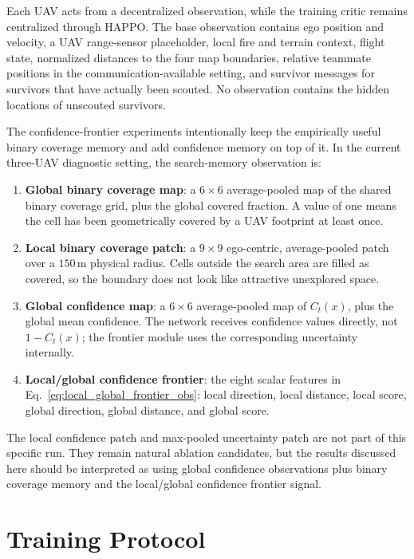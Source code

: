 \documentclass{article}
\newcommand{\conf}{C}
\begin{document}
Each UAV acts from a decentralized observation, while the training critic remains
centralized through HAPPO. The base observation contains ego position and
velocity, a UAV range-sensor placeholder, local fire and terrain context, flight
state, normalized distances to the four map boundaries, relative teammate
positions in the communication-available setting, and survivor messages for
survivors that have actually been scouted. No observation contains the hidden
locations of unscouted survivors.

The confidence-frontier experiments intentionally keep the empirically useful
binary coverage memory and add confidence memory on top of it. In the current
three-UAV diagnostic setting, the search-memory observation is:
\begin{enumerate}[leftmargin=1.5em]
    \item \textbf{Global binary coverage map}: a \(6 \times 6\) average-pooled map
    of the shared binary coverage grid, plus the global covered fraction. A value
    of one means the cell has been geometrically covered by a UAV footprint at
    least once.
    \item \textbf{Local binary coverage patch}: a \(9 \times 9\) ego-centric,
    average-pooled patch over a \(150\,\mathrm{m}\) physical radius. Cells outside
    the search area are filled as covered, so the boundary does not look like
    attractive unexplored space.
    \item \textbf{Global confidence map}: a \(6 \times 6\) average-pooled map of
    \(\conf_t(x)\), plus the global mean confidence. The network receives
    confidence values directly, not \(1-\conf_t(x)\); the frontier module uses
    the corresponding uncertainty internally.
    \item \textbf{Local/global confidence frontier}: the eight scalar features in
    Eq.~\ref{eq:local_global_frontier_obs}: local direction, local distance,
    local score, global direction, global distance, and global score.
\end{enumerate}
The local confidence patch and max-pooled uncertainty patch are not part of this
specific run. They remain natural ablation candidates, but the results discussed
here should be interpreted as using global confidence observations plus binary
coverage memory and the local/global confidence frontier signal.

\section{Training Protocol}
\end{document}
